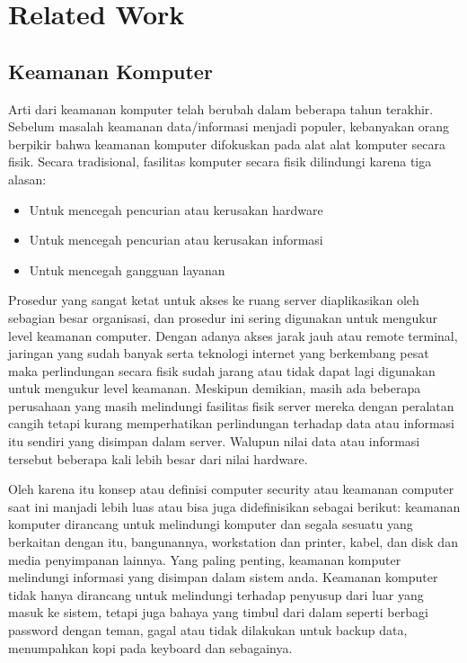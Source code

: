 \documentclass[conference]{IEEEtran}
\begin{document}
\section{Related Work}
\subsection{Keamanan Komputer}
Arti dari keamanan komputer telah berubah dalam beberapa tahun terakhir. Sebelum masalah keamanan data/informasi menjadi populer, kebanyakan orang berpikir bahwa keamanan komputer difokuskan pada alat alat komputer secara fisik. Secara tradisional, fasilitas komputer secara fisik dilindungi karena tiga alasan:
\begin{itemize}
    \item Untuk mencegah pencurian atau kerusakan hardware
    \item Untuk mencegah pencurian atau kerusakan informasi
    \item Untuk mencegah gangguan layanan
\end{itemize}

Prosedur yang sangat ketat untuk akses ke ruang server diaplikasikan oleh sebagian besar organisasi, dan prosedur ini sering digunakan untuk mengukur level keamanan computer. Dengan adanya akses jarak jauh atau remote terminal, jaringan yang sudah banyak serta teknologi internet yang berkembang pesat maka perlindungan secara fisik sudah jarang atau tidak dapat lagi digunakan untuk mengukur level keamanan. Meskipun demikian, masih ada beberapa perusahaan yang masih melindungi fasilitas fisik server mereka dengan peralatan cangih tetapi kurang memperhatikan perlindungan terhadap data atau informasi itu sendiri yang disimpan dalam server. Walupun nilai data atau informasi tersebut beberapa kali lebih besar dari nilai hardware.

Oleh karena itu konsep atau definisi computer security atau keamanan computer saat ini manjadi lebih luas atau bisa juga didefinisikan sebagai berikut: keamanan komputer dirancang untuk melindungi komputer dan segala sesuatu yang berkaitan dengan itu, bangunannya, workstation dan printer, kabel, dan disk dan media penyimpanan lainnya. Yang paling penting, keamanan komputer melindungi informasi yang disimpan dalam sistem anda. Keamanan komputer tidak hanya dirancang untuk melindungi terhadap penyusup dari luar yang masuk ke sistem, tetapi juga bahaya yang timbul dari dalam seperti berbagi password dengan teman, gagal atau tidak dilakukan untuk backup data, menumpahkan kopi pada keyboard dan sebagainya.
\end{document}
